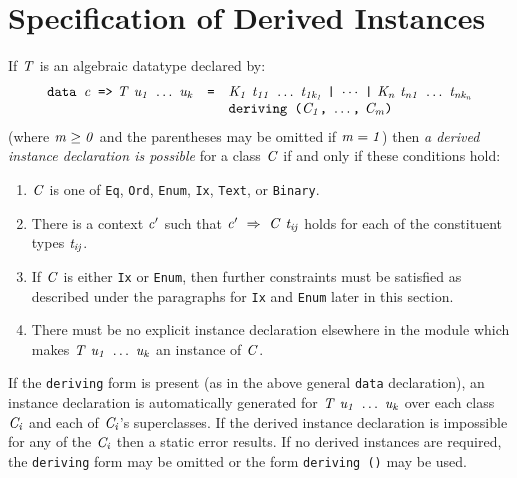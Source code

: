 %
%

\section{Specification of Derived Instances}
\label{derived-appendix}

If \mbox{$\it T$} is an algebraic datatype declared by:
\[\begin{array}{lcl}
\mbox{$\it \makebox{\tt data\ }c\makebox{\tt \ =>}\ T\ u_1\ \ldots \ u_k$}&\mbox{\tt =}&\mbox{$\it K_1\ t_{11}\ \ldots \ t_{1k_1}\ \makebox{\tt |}\ \cdots\ \makebox{\tt |}\ K_n\ t_{n1}\ \ldots \ t_{nk_n}$}\\
& & \mbox{$\it \makebox{\tt deriving\ (}C_1\makebox{\tt ,}\ \ldots \makebox{\tt ,}\ C_m\makebox{\tt )}$}
\end{array}\]
(where \mbox{$\it m\geq0$} and the parentheses may be omitted if \mbox{$\it m=1$}) then
{\em a derived instance declaration is possible} for a class \mbox{$\it C$} 
if and only if these conditions hold:
\begin{enumerate}
\item
\mbox{$\it C$} is one of \mbox{\tt Eq}, \mbox{\tt Ord}, \mbox{\tt Enum}, \mbox{\tt Ix}, \mbox{\tt Text}, or \mbox{\tt Binary}.

\item
There is a context \mbox{$\it c'$} such that \mbox{$\it c'\ \Rightarrow\ C\ t_{ij}$}
holds for each of the constituent types \mbox{$\it t_{ij}$}.

\item
If \mbox{$\it C$} is either \mbox{\tt Ix} or \mbox{\tt Enum}, then further constraints must be
satisfied as described under the paragraphs for \mbox{\tt Ix} and \mbox{\tt Enum}
later in this section.

\item
There must be no explicit instance declaration elsewhere in the module which
makes \mbox{$\it T\ u_1\ \ldots \ u_k$} an instance of \mbox{$\it C$}.
\end{enumerate}

If the \mbox{\tt deriving} form is present (as in the above 
general \mbox{\tt data} declaration),
an instance declaration is automatically generated for \mbox{$\it T\ u_1\ \ldots \ u_k$}
over each class \mbox{$\it C_i$} and each of \mbox{$\it C_i$}'s superclasses.
If the derived instance declaration is impossible for any of the \mbox{$\it C_i$}
then a static error results.
If no derived instances are required, the \mbox{\tt deriving} form may be
omitted or the form \mbox{\tt deriving\ ()} may be used.

